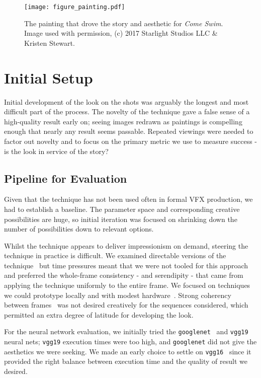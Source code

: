 \documentclass{acmsiggraph}
\begin{document}
\begin{figure}[ht]
  \centering
  \texttt{[image: figure\_painting.pdf]}
  \caption{The painting that drove the story and aesthetic for \textit{Come Swim}. Image used with permission, (c) 2017 Starlight Studios LLC \& Kristen Stewart.}
  \label{fig:painting}
\end{figure}

\section{Initial Setup}
Initial development of the look on the shots was arguably the longest and most difficult part of the process. The novelty of the technique gave a false sense of a high-quality result early on; seeing images redrawn as paintings is compelling enough that nearly any result seems passable. Repeated viewings were needed to factor out novelty and to focus on the primary metric we use to measure success - is the look in service of the story?

\subsection{Pipeline for Evaluation}
Given that the technique has not been used often in formal VFX production, we had to establish a baseline. The parameter space and corresponding creative possibilities are huge, so initial iteration was focused on shrinking down the number of possibilities down to relevant options.

Whilst the technique appears to deliver impressionism on demand, steering the technique in practice is difficult. We examined directable versions of the technique~\cite{ulyanov:2016} but time pressures meant that we were not tooled for this approach and preferred the whole-frame consistency - and serendipity - that came from applying the technique uniformly to the entire frame. We focused on techniques we could prototype locally and with modest hardware~\cite{liu:2016}. Strong coherency between frames~\cite{ruder:2016} was not desired creatively for the sequences considered, which permitted an extra degree of latitude for developing the look.

For the neural network evaluation, we initially tried the \texttt{googlenet}~\cite{szegedy:2015} and \texttt{vgg19}~\cite{simonyan:2014} neural nets; \texttt{vgg19} execution times were too high, and \texttt{googlenet} did not give the aesthetics we were seeking. We made an early choice to settle on \texttt{vgg16}~\cite{simonyan:2014} since it provided the right balance between execution time and the quality of result we desired.
\end{document}
